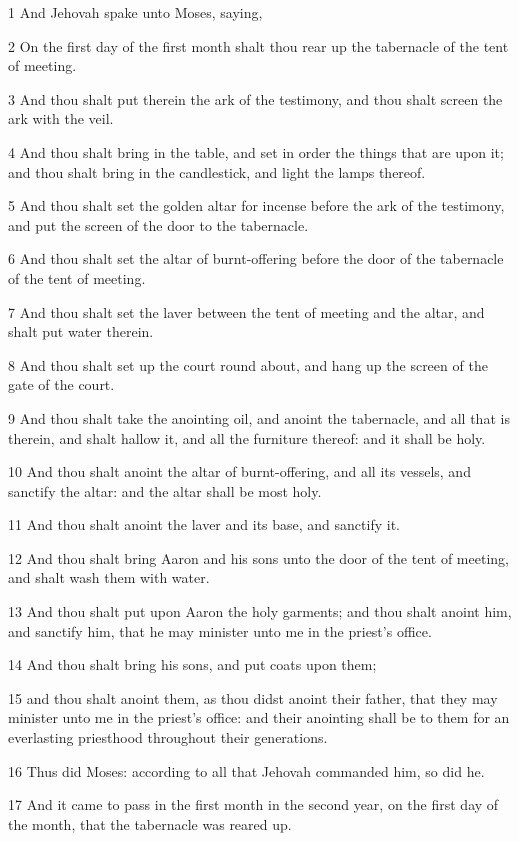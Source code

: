 \par 1 And Jehovah spake unto Moses, saying,
\par 2 On the first day of the first month shalt thou rear up the tabernacle of the tent of meeting.
\par 3 And thou shalt put therein the ark of the testimony, and thou shalt screen the ark with the veil.
\par 4 And thou shalt bring in the table, and set in order the things that are upon it; and thou shalt bring in the candlestick, and light the lamps thereof.
\par 5 And thou shalt set the golden altar for incense before the ark of the testimony, and put the screen of the door to the tabernacle.
\par 6 And thou shalt set the altar of burnt-offering before the door of the tabernacle of the tent of meeting.
\par 7 And thou shalt set the laver between the tent of meeting and the altar, and shalt put water therein.
\par 8 And thou shalt set up the court round about, and hang up the screen of the gate of the court.
\par 9 And thou shalt take the anointing oil, and anoint the tabernacle, and all that is therein, and shalt hallow it, and all the furniture thereof: and it shall be holy.
\par 10 And thou shalt anoint the altar of burnt-offering, and all its vessels, and sanctify the altar: and the altar shall be most holy.
\par 11 And thou shalt anoint the laver and its base, and sanctify it.
\par 12 And thou shalt bring Aaron and his sons unto the door of the tent of meeting, and shalt wash them with water.
\par 13 And thou shalt put upon Aaron the holy garments; and thou shalt anoint him, and sanctify him, that he may minister unto me in the priest's office.
\par 14 And thou shalt bring his sons, and put coats upon them;
\par 15 and thou shalt anoint them, as thou didst anoint their father, that they may minister unto me in the priest's office: and their anointing shall be to them for an everlasting priesthood throughout their generations.
\par 16 Thus did Moses: according to all that Jehovah commanded him, so did he.
\par 17 And it came to pass in the first month in the second year, on the first day of the month, that the tabernacle was reared up.
